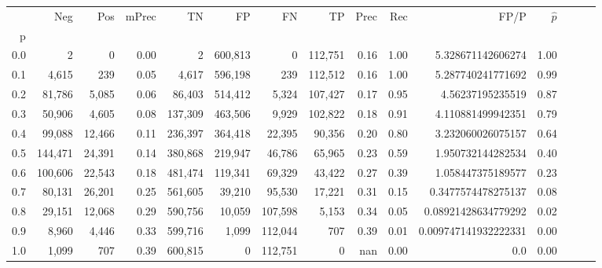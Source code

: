 \begin{tabular}{rrrrrrrrrrrrrrr}
\toprule
{} &      Neg &     Pos & mPrec &       TN &       FP &       FN &       TP &  Prec &   Rec &                  FP/P & $\hat{p}$ \\
p   &          &         &       &          &          &          &          &       &       &                       &           \\
\midrule
0.0 &        2 &       0 &  0.00 &        2 &  600,813 &        0 &  112,751 &  0.16 &  1.00 &     5.328671142606274 &      1.00 \\
0.1 &    4,615 &     239 &  0.05 &    4,617 &  596,198 &      239 &  112,512 &  0.16 &  1.00 &     5.287740241771692 &      0.99 \\
0.2 &   81,786 &   5,085 &  0.06 &   86,403 &  514,412 &    5,324 &  107,427 &  0.17 &  0.95 &      4.56237195235519 &      0.87 \\
0.3 &   50,906 &   4,605 &  0.08 &  137,309 &  463,506 &    9,929 &  102,822 &  0.18 &  0.91 &     4.110881499942351 &      0.79 \\
0.4 &   99,088 &  12,466 &  0.11 &  236,397 &  364,418 &   22,395 &   90,356 &  0.20 &  0.80 &     3.232060026075157 &      0.64 \\
0.5 &  144,471 &  24,391 &  0.14 &  380,868 &  219,947 &   46,786 &   65,965 &  0.23 &  0.59 &     1.950732144282534 &      0.40 \\
0.6 &  100,606 &  22,543 &  0.18 &  481,474 &  119,341 &   69,329 &   43,422 &  0.27 &  0.39 &     1.058447375189577 &      0.23 \\
0.7 &   80,131 &  26,201 &  0.25 &  561,605 &   39,210 &   95,530 &   17,221 &  0.31 &  0.15 &    0.3477574478275137 &      0.08 \\
0.8 &   29,151 &  12,068 &  0.29 &  590,756 &   10,059 &  107,598 &    5,153 &  0.34 &  0.05 &   0.08921428634779292 &      0.02 \\
0.9 &    8,960 &   4,446 &  0.33 &  599,716 &    1,099 &  112,044 &      707 &  0.39 &  0.01 &  0.009747141932222331 &      0.00 \\
1.0 &    1,099 &     707 &  0.39 &  600,815 &        0 &  112,751 &        0 &   nan &  0.00 &                   0.0 &      0.00 \\
\bottomrule
\end{tabular}
